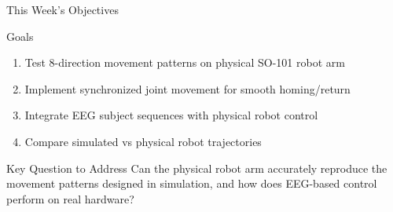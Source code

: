 \documentclass[aspectratio=169, 11pt]{beamer}
\begin{document}
\begin{frame}{This Week's Objectives}
    \begin{block}{Goals}
        \begin{enumerate}
            \item Test 8-direction movement patterns on physical SO-101 robot arm
            \item Implement synchronized joint movement for smooth homing/return
            \item Integrate EEG subject sequences with physical robot control
            \item Compare simulated vs physical robot trajectories
        \end{enumerate}
    \end{block}
    
    \vspace{5mm}
    
    \begin{alertblock}{Key Question to Address}
        Can the physical robot arm accurately reproduce the movement patterns designed in simulation, and how does EEG-based control perform on real hardware?
    \end{alertblock}
\end{frame}
\end{document}
